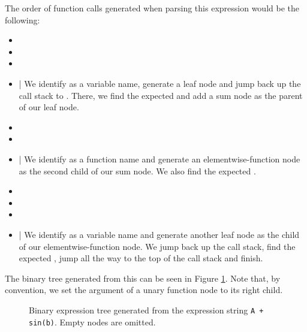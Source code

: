 \documentclass[12pt, a4paper]{report}
\begin{document}
The order of function calls generated when parsing this expression would be the following:
\FloatBarrier
\begin{itemize}
    \setlength\itemsep{0.01em}
    \item {}
    \item {}
    \item {}
    \item {} | We identify  as a variable name, generate a leaf node and jump back up the call stack to . There, we find the expected  and add a sum node as the parent of our leaf node.
    \item {}
    \item {}
    \item {} | We identify  as a function name and generate an elementwise-function node as the second child of our sum node. We also find the expected .
    \item {}
    \item {}
    \item {}
    \item {} | We identify  as a variable name and generate another leaf node as the child of our elementwise-function node. We jump back up the call stack, find the expected , jump all the way to the top of the call stack and finish.
\end{itemize}
\FloatBarrier
The binary tree generated from this can be seen in Figure \ref{fig:tree_example}.
Note that, by convention, we set the argument of a unary function node to its right child.

\begin{figure}
    \centering
    \caption{Binary expression tree generated from the expression string \texttt{A + sin(b)}. Empty nodes are omitted.}
    \label{fig:tree_example}
\end{figure}
\end{document}
